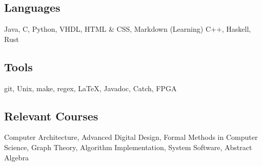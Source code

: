 \documentclass[18pt]{article}
\begin{document}
  \subsection*{Languages}\label{languages}
  Java,
  C,
  Python,
  VHDL,
  HTML \& CSS,
  Markdown
  (Learning) C++, Haskell, Rust
  
  \subsection*{Tools}\label{tools}
  git,
  Unix,
  make,
  regex,
  \LaTeX,
  Javadoc,
  Catch,
  FPGA
  
  \subsection*{Relevant Courses}\label{relevant-courses}
      Computer Architecture,
      Advanced Digital Design,
      Formal Methods in Computer Science,
      Graph Theory,
      Algorithm Implementation,
      System Software,
      Abstract Algebra
    
\end{document}
